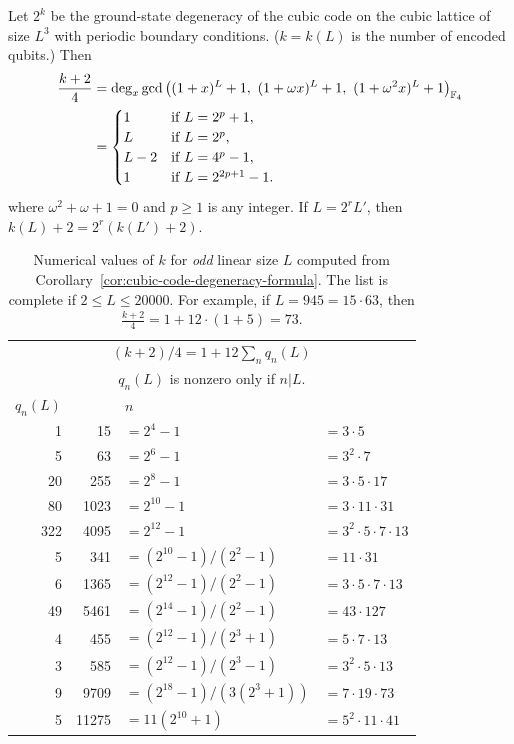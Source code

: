 \begin{cor}
\label{cor:cubic-code-degeneracy-formula}
Let $2^k$ be the ground-state degeneracy of
the cubic code on the cubic lattice of size $L^3$ with periodic boundary conditions.
($k=k(L)$ is the number of encoded qubits.)
Then
\begin{align*}
\frac{k+2}{4} 
&= \deg_x \gcd \left( (1+x)^{L}+1,~ (1+\omega x)^{L}+1,~ (1+\omega^2 x)^{L}+1 \right)_{\mathbb{F}_4} \\
&= \begin{cases}
     1    & \text{if $L = 2^p+1$}, \\
     L    & \text{if $L =2^p$}, \\
     L-2  & \text{if $L = 4^p -1$}, \\
     1    & \text{if $L = 2^{2p+1} -1$}.
   \end{cases}
\label{eq:cubic-code-formula-k}
\end{align*}
where $\omega^2 + \omega + 1 = 0$ and $p \ge 1$ is any integer.
If $L = 2^r L'$, then $k(L)+2 = 2^r( k(L') + 2 )$.
\end{cor}

\begin{table}[tp]
\centering
\begin{tabular}{r|rll}
\hline
\multicolumn{4}{c}{$(k+2)/4 = 1 + 12 \sum_n q_n(L)$} \\
\multicolumn{4}{c}{$q_n(L)$ is nonzero only if $n | L$.} \\
\hline
$q_n(L)$&  & $n$ & \\
\hline
1 & 15 & $= 2^4 -1$ & $=3 \cdot 5$  \\
5 & 63 & $= 2^6 -1$ & $=3^2 \cdot 7$  \\
20 & 255 & $= 2^8 -1$ & $=3 \cdot 5 \cdot 17$  \\
80 & 1023 & $=2^{10}-1$ & $=3 \cdot 11 \cdot 31$  \\
322 & 4095 & $= 2^{12} -1$ & $=3^2 \cdot 5 \cdot 7 \cdot 13$ \\
\hline
5 & 341 & $=(2^{10}-1)/(2^2 -1)$ & $= 11 \cdot 31$  \\
6 & 1365 & $=(2^{12}-1)/(2^2 -1)$ & $=3 \cdot 5 \cdot 7 \cdot 13$  \\
49 & 5461 & $=(2^{14}-1)/(2^2 -1)$ & $=43 \cdot 127$  \\
\hline
4 & 455 & $=(2^{12}-1)/(2^3 +1)$ & $= 5 \cdot 7 \cdot 13$  \\
3 & 585 & $=(2^{12}-1)/(2^3 -1)$ & $= 3^2 \cdot 5 \cdot 13$  \\
9 & 9709& $=(2^{18}-1)/(3(2^3+1))$& $= 7\cdot 19 \cdot 73$  \\
5 & 11275&$=11(2^{10}+1)$ & $=5^2 \cdot 11 \cdot 41$ \\
\hline
\end{tabular}
\caption{Numerical values of $k$ for \emph{odd} linear size $L$
computed from Corollary~\ref{cor:cubic-code-degeneracy-formula}.
The list is complete if $2 \le L \le 20000$.
For example, if $L=945=15 \cdot 63$, then $\frac{k+2}{4} = 1 + 12\cdot(1+5) = 73$.
}
\label{tb:k-numerics}
\end{table}


